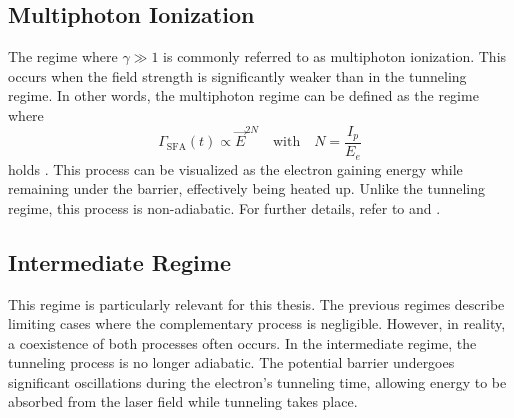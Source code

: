\subsection{Multiphoton Ionization}
The regime where $\gamma \gg 1$ is commonly referred to as multiphoton ionization.
This occurs when the field strength is significantly weaker than in the tunneling regime.
In other words, the multiphoton regime can be defined as the regime where
\begin{equation*}
    \Gamma_{\mathrm{SFA}}(t) \propto \vec{E}^{2N} \quad \text{with} \quad N = \frac{I_p}{E_e}
\end{equation*}
holds \cite{Ivanov20012005}.
This process can be visualized as the electron gaining energy while remaining under the barrier, effectively being heated up.
Unlike the tunneling regime, this process is non-adiabatic.
For further details, refer to \cite{Ivanov20012005} and \cite{Keldysh:1965ojf}.

\subsection{Intermediate Regime}
This regime is particularly relevant for this thesis.
The previous regimes describe limiting cases where the complementary process is negligible.
However, in reality, a coexistence of both processes often occurs.
In the intermediate regime, the tunneling process is no longer adiabatic.
The potential barrier undergoes significant oscillations during the electron's tunneling time, allowing energy to be absorbed from the laser field while tunneling takes place.